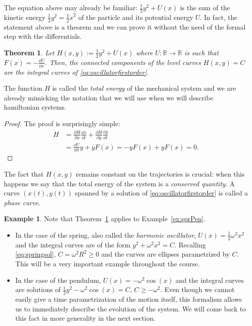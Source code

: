\documentclass[english,fontsize=11pt,paper=b5]{scrbook}
\newtheorem{theorem}{Theorem}[chapter]
\theoremstyle{definition}
\newtheorem{example}{Example}[chapter]
\begin{document}
    The equation above may already be familiar: $\frac12 y^2 + U(x)$ is the sum of the kinetic energy $\frac12 y^2 = \frac12 {\dot x}^2$ of the particle and its potential energy $U$. In fact, the statement above is a theorem and we can prove it without the need of the formal step with the differentials.

    \begin{theorem}\label{thm:ham1}
      Let $H(x, y) := \frac12 y^2 + U(x)$ where $U:\mathbb{R}\to\mathbb{R}$ is such that $F(x) = -\frac{\dd U}{\dd x}$.
      Then, the connected components of the level curves $H(x,y) = C$ are the integral curves of \eqref{eq:oscillatorfirstorder}.
    \end{theorem}
    The function $H$ is called the \emph{total energy} of the mechanical system and we are already mimicking the notation that we will use when we will describe hamiltonian systems.
    \begin{proof}
      The proof is surprisingly simple:
      \begin{align}
        \dot H & = \frac{\partial H}{\partial x}\frac{\dd x}{\dd t} + \frac{\partial H}{\partial y}\frac{\dd y}{\dd t} \\
               & = \frac{\dd U}{\dd x} y + y F(x)
               = -y F(x) + y F(x) = 0.
      \end{align}
    \end{proof}

    The fact that $H(x,y)$ remains constant on the trajectories is crucial: when this happens we say that the total energy of the system is a \emph{conserved quantity}.
    A curve $(x(t), y(t))$ spanned by a solution of \eqref{eq:oscillatorfirstorder} is called a \emph{phase curve}.

    \begin{example}
      Note that Theorem~\ref{thm:ham1} applies to Example~\ref{ex:sprPen}.
      \begin{itemize}
        \item In the case of the spring, also called the \emph{harmonic oscillator}, $U(x) = \frac12 \omega^2 x^2$ and the integral curves are of the form $y^2 + \omega^2 x^2 = C$.
          Recalling \eqref{eq:springsol}, $C = \omega^2 R^2 \geq 0$ and the curves are ellipses parametrized by $C$.
          This will be a very important example throughout the course.
        \item In the case of the pendulum, $U(x) = -\omega^2 \cos(x)$ and the integral curves are solutions of $\frac12 y^2 - \omega^2 \cos(x) = C$, $C \geq -\omega^2$.
          Even though we cannot easily give a time parametrization of the motion itself, this formalism allows us to immediately describe the evolution of the system.
          We will come back to this fact in more generality in the next section.
      \end{itemize}
    \end{example}
\end{document}
